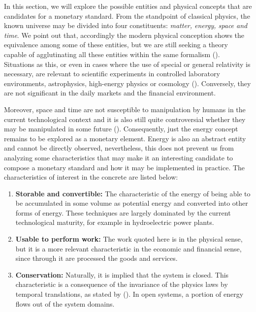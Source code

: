 \documentclass[11pt]{article}
\begin{document}
In this section, we will explore the possible entities and physical concepts that are candidates for a monetary standard. From the 
standpoint of classical physics, the known universe may be divided into four constituents: \emph{matter, energy, space and time}. We point 
out that, accordingly the modern physical conception shows the equivalence among some of these entities, but we are still seeking a theory 
capable of agglutinating all these entities within the same formalism (\citealt{TEORIA_UNIFICADA}). Situations as this, or even in cases 
where the use of special or general relativity is necessary, are relevant to scientific experiments in controlled laboratory environments, 
astrophysics, high-energy physics or cosmology (\citealt{APLIC_RELATIVIDADE}). Conversely, they are not significant in the daily markets 
and the financial environment.

Moreover, space and time are not susceptible to manipulation by humans in the current technological context and it is also still quite 
controversial whether they may be manipulated in some future (\citealt{TIMETRAVEL01, VIAGENS_TEMPO, TIMETRAVEL02}). Consequently, just the 
energy concept remains to be explored as a monetary element. Energy is also an abstract entity and cannot be directly observed, 
nevertheless, this does not prevent us from analyzing some characteristics that may make it an interesting candidate to compose a monetary 
standard and how it may be implemented in practice. The characteristics of interest in the concrete are listed below:
\begin{enumerate}
 \item \textbf{{Storable and convertible:}} The characteristic of the energy of being able to be accumulated in some volume as potential 
energy and converted into other forms of energy. These techniques are largely dominated by the current technological maturity, for example 
in hydroelectric power plants.
 \item \textbf{{Usable to perform work:}} The work quoted here is in the physical sense, but it is a more relevant characteristic in the 
economic and financial sense, since through it are processed the goods and services.
 \item \textbf{{Conservation:}} Naturally, it is implied that the system is closed. This characteristic is a consequence of the invariance 
of the physics laws by temporal translations, as stated by (\citealt{Noether1918}). In open systems, a portion of energy flows out of the 
system domains\footnotemark. 
\end{enumerate}
\end{document}
